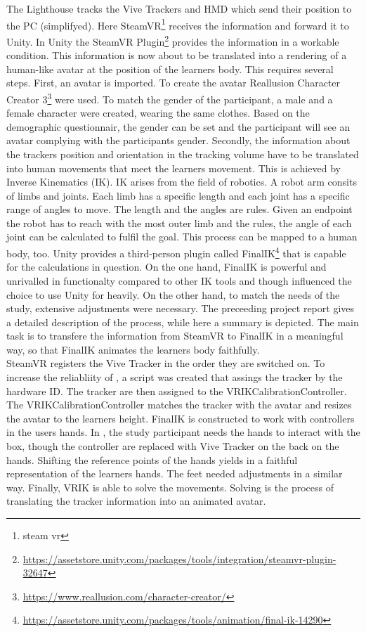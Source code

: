 The Lighthouse tracks the Vive Trackers and HMD which send their position to the PC (simplifyed). Here SteamVR\footnote{steam vr} receives the information and forward it to Unity. In Unity the SteamVR Plugin\footnote{\href{https://assetstore.unity.com/packages/tools/integration/steamvr-plugin-32647}{https://assetstore.unity.com/packages/tools/integration/steamvr-plugin-32647}} provides the information in a workable condition. This information is now about to be translated into a rendering of a human-like avatar at the position of the learners body. This requires several steps. First, an avatar is imported. To create the avatar Reallusion Character Creator 3\footnote{\href{https://www.reallusion.com/character-creator/}{https://www.reallusion.com/character-creator/}} were used. To match the gender of the participant, a male and a female character were created, wearing the same clothes. Based on the demographic questionnair, the gender can be set and the participant will see an avatar complying with the participants gender. Secondly, the information about the trackers position and orientation in the tracking volume have to be translated into human movements that meet the learners movement. This is achieved by Inverse Kinematics (IK). IK arises from the field of robotics. A robot arm consits of limbs and joints. Each limb has a specific length and each joint has a specific range of angles to move. The length and the angles are rules. Given an endpoint the robot has to reach with the most outer limb and the rules, the angle of each joint can be calculated to fulfil the goal. This process can be mapped to a human body, too. Unity provides a third-person plugin called FinalIK\footnote{\href{https://assetstore.unity.com/packages/tools/animation/final-ik-14290}{https://assetstore.unity.com/packages/tools/animation/final-ik-14290}} that is capable for the calculations in question. On the one hand, FinalIK is powerful and unrivalled in functionalty compared to other IK tools and though influenced the choice to use Unity for \exgo heavily. On the other hand, to match the needs of the study, extensive adjustments were necessary. The preceeding project report gives a detailed description of the process, while here a summary is depicted. The main task is to transfere the information from SteamVR to FinalIK in a meaningful way, so that FinalIK animates the learners body faithfully.\\
SteamVR registers the Vive Tracker in the order they are switched on. To increase the reliabliity of \exgo, a script was created that assings the tracker by the hardware ID. The tracker are then assigned to the VRIKCalibrationController. The VRIKCalibrationController matches the tracker with the avatar and resizes the avatar to the learners height. FinalIK is constructed to work with controllers in the users hands. In \exgo, the study participant needs the hands to interact with the box, though the controller are replaced with Vive Tracker on the back on the hands. Shifting the reference points of the hands yields in a faithful representation of the learners hands. The feet needed adjustments in a similar way. Finally, VRIK is able to solve the movements. Solving is the process of translating the tracker information into an animated avatar.\\
